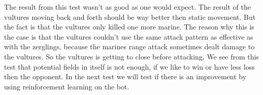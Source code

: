 The result from this test wasn't as good as one would expect. The result of the vultures moving back and forth should be way better then static movement. But the fact is that the vultures only killed one more marine. The reason why this is the case is that the vultures couldn't use the same attack pattern as effective as with the zerglings, because the marines range attack sometimes dealt damage to the vultures. So the vultures is getting to close before attacking.
We see from this test that potential fields in itself is not enough, if we like to win or have less loss then the opponent. In the next test we will test if there is an improvement by using reinforcement learning on the bot.





